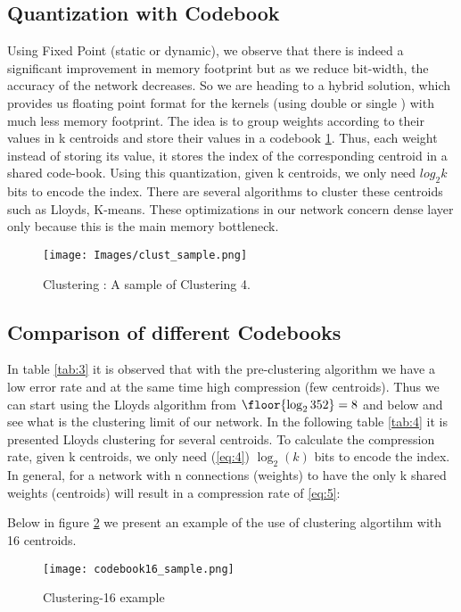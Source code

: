  \subsection{Quantization with Codebook}
Using Fixed Point (static or dynamic), we observe that there is indeed a significant improvement in memory footprint but as we reduce bit-width, the accuracy of the network decreases. So we are heading to a hybrid solution, which provides us floating point format for the kernels (using double or single ) with much less memory footprint. The idea is to group weights according to their values in k centroids and store their values in a codebook \ref{fig:clust_sample}. Thus, each weight instead of storing its value, it stores the index of the corresponding centroid in a shared code-book. Using this quantization, given k centroids, we only need $log_2 k$ bits to encode the index. There are several algorithms to cluster these centroids such as Lloyds, K-means. These optimizations in our network concern dense layer only because this is the main memory bottleneck.

\begin{figure}[h]
\centering
\texttt{[image: Images/clust\_sample.png]} 
\decoRule
\caption[Clustering sample]{Clustering : A sample of Clustering 4. 
}
\label{fig:clust_sample}
\end{figure}

\subsection{Comparison of different Codebooks}
In table \ref{tab:3} it is observed that with the pre-clustering algorithm we have a low error rate and at the same time high compression (few centroids). Thus we can start using the Lloyds algorithm from $\floor{\log_2 352}=8$ and below and see what is the clustering limit of our network. In the following table \ref{tab:4} it is presented Lloyds clustering for several centroids. To calculate the compression rate, given k centroids, we only need (\ref{eq:4}) $\log_2(k)$ bits to encode the index. In general, for a network with n connections (weights) to have the only k shared weights (centroids) will result in a compression rate of \ref{eq:5}: 

Below in figure \ref{fig:clus16_ex} we present an example of the use of clustering algortihm with 16 centroids.
\begin{figure}[h]
\centering
\texttt{[image: codebook16\_sample.png]} 
\decoRule
\caption[Clustering-16 example]{Clustering-16 example
}
\label{fig:clus16_ex}
\end{figure}

